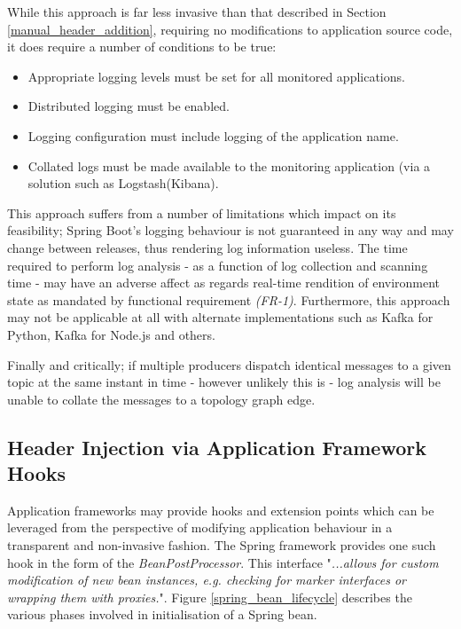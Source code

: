 While this approach is far less invasive than that described in Section \ref{manual_header_addition}, requiring no modifications to application source code, it does require a number of conditions to be true:

\begin{itemize}
	\item Appropriate logging levels must be set for all monitored applications.
	\item Distributed logging must be enabled.
	\item Logging configuration must include logging of the application name.
	\item Collated logs must be made available to the monitoring application (via a solution such as Logstash(Kibana).
\end{itemize}

This approach suffers from a number of limitations which impact on its feasibility; Spring Boot's logging behaviour is not guaranteed in any way and may change between releases, thus rendering log information useless. The time required to perform log analysis - as a function of log collection and scanning time - may have an adverse affect as regards real-time rendition of environment state as mandated by functional requirement \textit{(FR-1)}. Furthermore, this approach may not be applicable at all with alternate implementations such as Kafka for Python, Kafka for Node.js and others.

Finally and critically; if multiple producers dispatch identical messages to a given topic at the same instant in time - however unlikely this is - log analysis will be unable to collate the messages to a topology graph edge. 

\subsection{Header Injection via Application Framework Hooks} \label{kafka_producer_header_design}

Application frameworks may provide hooks and extension points which can be leveraged from the perspective of modifying application behaviour in a transparent and non-invasive fashion. The Spring framework provides one such hook in the form of the \textit{BeanPostProcessor}. This interface "\textit{...allows for custom modification of new bean instances, e.g. checking for marker interfaces or wrapping them with proxies.}"\cite{BeanPostProcessor}. Figure \ref{spring_bean_lifecycle} describes the various phases involved in initialisation of a Spring bean.

